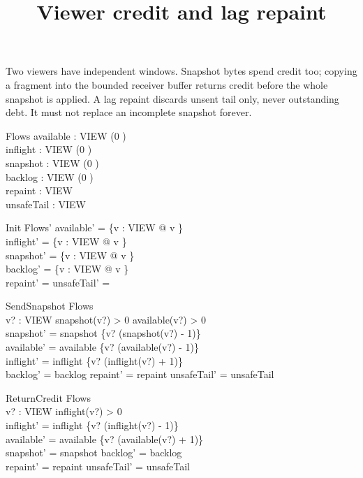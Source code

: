 \documentclass[a4paper,10pt]{article}
\begin{document}
\title{Viewer credit and lag repaint}
\maketitle

Two viewers have independent windows. Snapshot bytes spend credit too;
copying a fragment into the bounded receiver buffer returns credit before
the whole snapshot is applied. A lag repaint discards unsent tail only,
never outstanding debt. It must not replace an incomplete snapshot forever.

\begin{zed}
[VIEW]
\end{zed}
\begin{schema}{Flows}
available : VIEW \fun (0 ) \\
inflight : VIEW \fun (0 ) \\
snapshot : VIEW \fun (0 ) \\
backlog : VIEW \fun (0 ) \\
repaint : \power VIEW \\
unsafeTail : \power VIEW
\end{schema}
\begin{schema}{Init}
Flows'
\where
available' = \{v : VIEW @ v \} \\
inflight' = \{v : VIEW @ v \} \\
snapshot' = \{v : VIEW @ v \} \\
backlog' = \{v : VIEW @ v \} \\
repaint' = \emptyset \land unsafeTail' = \emptyset
\end{schema}
\begin{schema}{SendSnapshot}
\Delta Flows \\
v? : VIEW
\where
snapshot(v?) > 0 \land available(v?) > 0 \\
snapshot' = snapshot \oplus \{v? \mapsto (snapshot(v?) - 1)\} \\
available' = available \oplus \{v? \mapsto (available(v?) - 1)\} \\
inflight' = inflight \oplus \{v? \mapsto (inflight(v?) + 1)\} \\
backlog' = backlog \land repaint' = repaint \land unsafeTail' = unsafeTail
\end{schema}
\begin{schema}{ReturnCredit}
\Delta Flows \\
v? : VIEW
\where
inflight(v?) > 0 \\
inflight' = inflight \oplus \{v? \mapsto (inflight(v?) - 1)\} \\
available' = available \oplus \{v? \mapsto (available(v?) + 1)\} \\
snapshot' = snapshot \land backlog' = backlog \\
repaint' = repaint \land unsafeTail' = unsafeTail
\end{schema}
\end{document}
